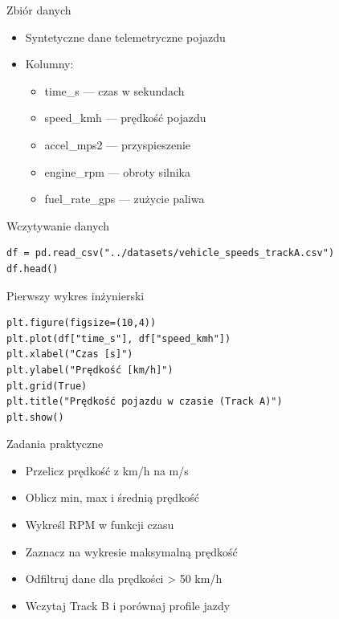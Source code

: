 \documentclass[aspectratio=169]{beamer}
\begin{document}
\begin{frame}{Zbiór danych}
  \begin{itemize}
    \item Syntetyczne dane telemetryczne pojazdu
    \item Kolumny:
      \begin{itemize}
        \item time\_s — czas w sekundach
        \item speed\_kmh — prędkość pojazdu
        \item accel\_mps2 — przyspieszenie
        \item engine\_rpm — obroty silnika
        \item fuel\_rate\_gps — zużycie paliwa
      \end{itemize}
  \end{itemize}
\end{frame}

\begin{frame}[fragile]{Wczytywanie danych}
\begin{verbatim}
df = pd.read_csv("../datasets/vehicle_speeds_trackA.csv")
df.head()
\end{verbatim}
\end{frame}

\begin{frame}[fragile]{Pierwszy wykres inżynierski}
\begin{verbatim}
plt.figure(figsize=(10,4))
plt.plot(df["time_s"], df["speed_kmh"])
plt.xlabel("Czas [s]")
plt.ylabel("Prędkość [km/h]")
plt.grid(True)
plt.title("Prędkość pojazdu w czasie (Track A)")
plt.show()
\end{verbatim}
\end{frame}

\begin{frame}{Zadania praktyczne}
  \begin{itemize}
    \item Przelicz prędkość z km/h na m/s
    \item Oblicz min, max i średnią prędkość
    \item Wykreśl RPM w funkcji czasu
    \item Zaznacz na wykresie maksymalną prędkość
    \item Odfiltruj dane dla prędkości > 50 km/h
    \item Wczytaj Track B i porównaj profile jazdy
  \end{itemize}
\end{frame}

\end{document}

